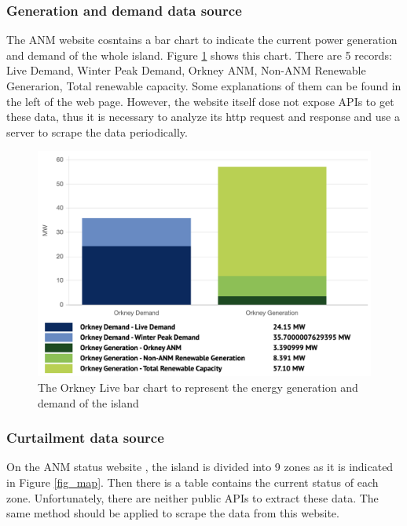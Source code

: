 \documentclass[12pt,a4paper]{report}
\begin{document}
            \subsubsection{Generation and demand data source}
            \label{text_generation_and_demand_data_source}
                The ANM website \cite{website:ANM} cosntains a bar chart to indicate the current power generation and demand of the whole
                island. Figure \ref{fig_anm_barchart} shows this chart. There are 5 records: Live Demand, Winter Peak Demand, Orkney ANM, Non-ANM Renewable Generarion, Total renewable capacity.
                Some explanations of them can be found in the left of the web page.
                However, the website itself dose not expose APIs to get these data, thus it is necessary to analyze its http request and response and use a 
                server to scrape the data periodically.

                \begin{figure}[ht]
                    \centerline{\includegraphics[scale=1]{anm_barchart}}
                    \caption{The Orkney Live bar chart to represent the energy generation and demand of the island}
                    \label{fig_anm_barchart}
                \end{figure}
            
            \subsubsection{Curtailment data source}
                On the ANM status website \cite{website:ANMstatus}, the island is divided into 9 zones as it is indicated in Figure \ref{fig_map}. Then there is a 
                table contains the current status of each zone. Unfortunately, there are neither public APIs to extract these data. The same method should
                be applied to scrape the data from this website.
\end{document}
